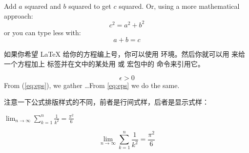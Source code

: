 \begin{example}
Add $a$ squared and $b$ squared
to get $c$ squared. Or, using
a more mathematical approach:
\begin{displaymath}
c^{2}=a^{2}+b^{2}
\end{displaymath}
or you can type less with:
\[a+b=c\]
\end{example}


如果你希望 \LaTeX{} 给你的方程编上号，你可以使用  环境。然后你就可以用  来给一个方程加上
标签并在文中的某处用  或  宏包中的  命令来引用它。
\begin{example}
\begin{equation} \label{eq:eps}
\epsilon > 0
\end{equation}
From (\ref{eq:eps}), we gather
\ldots{}From \eqref{eq:eps} we
do the same.
\end{example}

注意一下公式排版样式的不同，前者是行间式样，后者是显示式样：
\begin{example}
$\lim_{n \to \infty}
\sum_{k=1}^n \frac{1}{k^2}
= \frac{\pi^2}{6}$
\end{example}
\begin{example}
\begin{displaymath}
\lim_{n \to \infty}
\sum_{k=1}^n \frac{1}{k^2}
= \frac{\pi^2}{6}
\end{displaymath}
\end{example}



